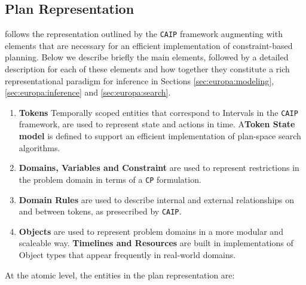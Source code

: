 \subsection{\eu Plan Representation}
\label{sec:europa:pr}

\eu follows the representation outlined by the \texttt{CAIP} framework
augmenting with elements that are necessary for an efficient
implementation of constraint-based planning. Below we describe briefly
the main elements, followed by a detailed description for each of
these elements and how together they constitute a rich
representational paradigm for inference in Sections
\ref{sec:europa:modeling}, \ref{sec:europa:inference} and
\ref{sec:europa:search}.

\begin{enumerate}

\item \textbf{Tokens} Temporally scoped entities that correspond to
  Intervals in the \texttt{CAIP} framework, are used to represent
  state and actions in time. A\textbf{Token State model} is defined to
  support an efficient implementation of plan-space search algorithms.

\item \textbf{Domains, Variables and Constraint} are used to represent
  restrictions in the problem domain in terms of a \texttt{CP}
  formulation.

\item \textbf{Domain Rules} are used to describe internal and external
  relationships on and between tokens, as presecribed by
  \texttt{CAIP}.
  
\item \textbf{Objects} are used to represent problem domains in a more
  modular and scaleable way. \textbf{Timelines and Resources} are
  built in implementations of Object types that appear frequently in
  real-world domains.

\end{enumerate}

At the atomic level, the entities in the \eu plan representation are:

